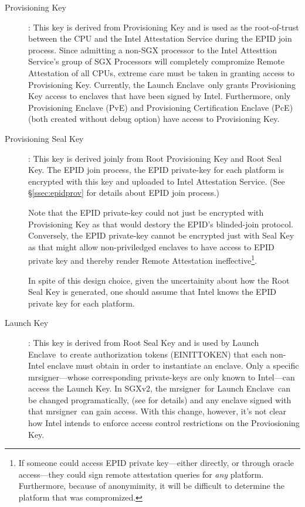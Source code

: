 \documentclass[10pt]{article}
\newcommand{\secref}[1]{\S\ref{#1}}
\newcommand{\mrsigner}{\textsf{mrsigner}}
\newcommand{\pve}{\textsf{PvE}}
\newcommand{\pce}{\textsf{PcE}}
\newcommand{\launchenclave}{\textsf{Launch Enclave}}
\begin{document}
  \begin{description}
  \item[Provisioning Key]: This key is derived from Provisioning Key
    and is used as the root-of-trust between the CPU and the Intel
    Attestation Service during the EPID join process. Since admitting
    a non-SGX processor to the Intel Attesttion Service's group of SGX
    Processors will completely compromize Remote Attestation of all
    CPUs, extreme care must be taken in granting access to
    Provisioning Key.  Currently, the \launchenclave\ only grants
    Provisioning Key access to enclaves that have been signed by
    Intel. Furthermore, only Provisioning Enclave (\pve) and
    Provisioning Certification Enclave (\pce) (both created without
    debug option) have access to Provisioning Key.


  \item[Provisioning Seal Key]: This key is derived joinly from Root
    Provisioning Key and Root Seal Key. The EPID join process, the
    EPID private-key for each platform is encrypted with this key and
    uploaded to Intel Attestation Service. (See \secref{ssec:epidprov}
    for details about EPID join process.)

    Note that the EPID private-key could not just be encrypted with
    Provisioning Key as that would destory the EPID's blinded-join
    protocol. Conversely, the EPID private-key cannot be encrypted
    just with Seal Key as that might allow non-priviledged enclaves to
    have access to EPID private key and thereby render Remote
    Attestation ineffective\footnote{If someone could access EPID
      private key---either directly, or through oracle access---they
      could sign remote attestation queries for \textit{any}
      platform. Furthermore, because of anonymimity, it will be
      difficult to determine the platform that was compromized.}.

    In spite of this design choice, given the uncertainity about how
    the Root Seal Key is generated, one should assume that Intel knows
    the EPID private key for each platform.

  \item[Launch Key]: This key is derived from Root Seal Key and is
    used by \launchenclave\ to create authorization tokens
    (\textsf{EINITTOKEN}) that each non-Intel enclave must obtain in
    order to instantiate an enclave. Only a specific \mrsigner---whose
    corresponding private-keys are only known to Intel---can access
    the Launch Key. In SGXv2, the \mrsigner\ for \launchenclave\ can
    be changed programatically, (see \cite[\S39.1.4]{intelsdm} for
    details) and any enclave signed with that \mrsigner\ can gain
    access. With this change, however, it's not clear how Intel
    intends to enforce access control restrictions on the
    Proviosioning Key.


\end{description}
\end{document}
